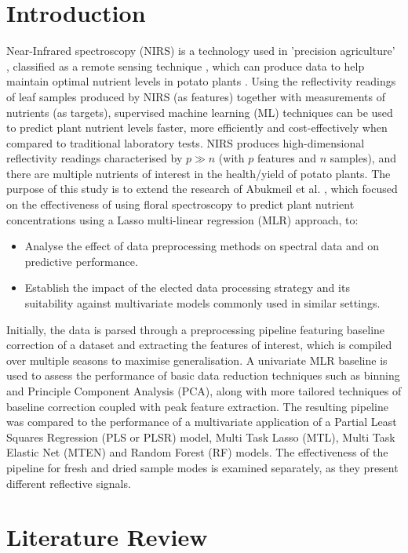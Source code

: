 \documentclass[conference]{IEEEtran}
\begin{document}
\section{Introduction}
Near-Infrared spectroscopy (NIRS) is a technology used in 'precision agriculture' \cite{Cavaco2022}, classified as a remote sensing technique \cite{Jafarbiglu2022}, which can produce data to help maintain optimal nutrient levels in potato plants \cite{Abukmeil2022}. Using the reflectivity readings of leaf samples produced by NIRS (as features) together with measurements of nutrients (as targets), supervised machine learning (ML) techniques can be used to predict plant nutrient levels faster, more efficiently and cost-effectively when compared to traditional laboratory tests. NIRS produces high-dimensional reflectivity readings characterised by $p \gg n$ (with $p$ features and $n$ samples), and there are multiple nutrients of interest in the health/yield of potato plants. The purpose of this study is to extend the research of Abukmeil et al. \cite{Abukmeil2022}, which focused on the effectiveness of using floral spectroscopy to predict plant nutrient concentrations using a Lasso multi-linear regression (MLR) approach, to:
\begin{itemize}
    \item Analyse the effect of data preprocessing methods on spectral data and on predictive performance.
    \item Establish the impact of the elected data processing strategy and its suitability against multivariate models commonly used in similar settings.
\end{itemize}
Initially, the data is parsed through a preprocessing pipeline featuring baseline correction of a dataset and extracting the features of interest, which is compiled over multiple seasons to maximise generalisation. A univariate MLR baseline is used to assess the performance of basic data reduction techniques such as binning and Principle Component Analysis (PCA), along with more tailored techniques of baseline correction coupled with peak feature extraction. The resulting pipeline was compared to the performance of a multivariate application of a Partial Least Squares Regression (PLS or PLSR) model, Multi Task Lasso (MTL), Multi Task Elastic Net (MTEN) and Random Forest (RF) models. The effectiveness of the pipeline for fresh and dried sample modes is examined separately, as they present different reflective signals.

\section{Literature Review}
\end{document}
